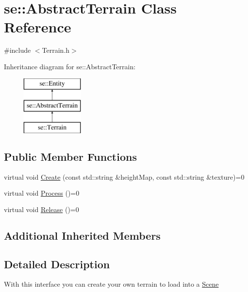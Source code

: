 \hypertarget{classse_1_1_abstract_terrain}{}\section{se\+:\+:Abstract\+Terrain Class Reference}
\label{classse_1_1_abstract_terrain}


{\ttfamily \#include $<$Terrain.\+h$>$}

Inheritance diagram for se\+:\+:Abstract\+Terrain\+:\begin{figure}[H]
\begin{center}
\leavevmode
\includegraphics[height=3.000000cm]{classse_1_1_abstract_terrain}
\end{center}
\end{figure}
\subsection*{Public Member Functions}
\begin{DoxyCompactItemize}
\item 
virtual void \mbox{\hyperlink{classse_1_1_abstract_terrain_ac8254489e68bcfc1960b968afeb683b0}{Create}} (const std\+::string \&height\+Map, const std\+::string \&texture)=0
\item 
virtual void \mbox{\hyperlink{classse_1_1_abstract_terrain_af2f0249eead2b62a82baa2ecbb52efeb}{Process}} ()=0
\item 
virtual void \mbox{\hyperlink{classse_1_1_abstract_terrain_aeee5b6c81be6aee211819b8d79718bf5}{Release}} ()=0
\end{DoxyCompactItemize}
\subsection*{Additional Inherited Members}


\subsection{Detailed Description}
With this interface you can create your own terrain to load into a \mbox{\hyperlink{classse_1_1_scene}{Scene}} 


